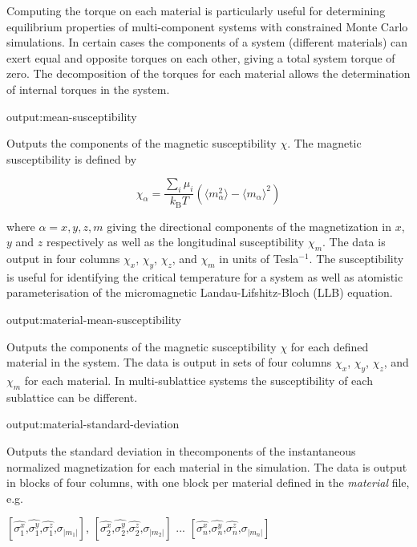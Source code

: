 Computing the torque on each material is particularly useful for determining equilibrium properties of multi-component systems with constrained Monte Carlo simulations. In certain cases the components of a system (different materials) can exert equal and opposite torques on each other, giving a total system torque of zero. The decomposition of the torques for each material allows the determination of internal torques in the system.

{\zicf output:mean-susceptibility} Outputs the components of the magnetic susceptibility $\chi$. The magnetic susceptibility is defined by

\begin{equation*}
\chi_{\alpha} = \frac{\sum_i \mu_i}{k_{\mathrm{B}}T}\left(\langle m_{\alpha}^2\rangle - \langle m_{\alpha}\rangle^2 \right)
\end{equation*}

\noindent where $\alpha = x,y,z,m$ giving the directional components of the magnetization in $x$, $y$ and $z$ respectively as well as the longitudinal susceptibility $\chi_m$. The data is output in four columns $\chi_x$, $\chi_y$, $\chi_z$, and $\chi_m$ in units of Tesla$^{-1}$. The susceptibility is useful for identifying the critical temperature for a system as well as atomistic parameterisation of the micromagnetic
Landau-Lifshitz-Bloch (LLB) equation.

{\zicf output:material-mean-susceptibility} Outputs
the components of the magnetic susceptibility $\chi$ for each defined material in the system. The data is output in sets of
four columns $\chi_x$, $\chi_y$, $\chi_z$, and $\chi_m$ for each material. In multi-sublattice systems the susceptibility of
each sublattice can be different.

{\zicf output:material-standard-deviation} Outputs the standard deviation in the\newline components of the instantaneous normalized magnetization for each material in the simulation. The data is output in blocks of four columns, with one block per material defined in the \textit{material} file, e.g.

\begin{center}
$\left[ \hat{\sigma_1^x} \textrm{,} \hat{\sigma_1^y} \textrm{,} \hat{\sigma_1^z} \textrm{,} \sigma_{|m_1|} \right]$,
$\left[ \hat{\sigma_2^x} \textrm{,} \hat{\sigma_2^y} \textrm{,} \hat{\sigma_2^z} \textrm{,} \sigma_{|m_2|} \right]$ ...
$\left[ \hat{\sigma_n^x} \textrm{,} \hat{\sigma_n^y} \textrm{,} \hat{\sigma_n^z} \textrm{,} \sigma_{|m_n|} \right]$
\end{center}

